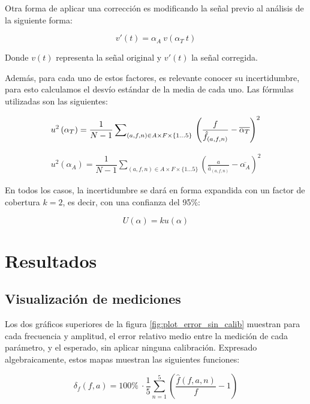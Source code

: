 \documentclass[conference]{IEEEtran}
\begin{document}
Otra forma de aplicar una corrección es modificando la señal previo al análisis
de la siguiente forma:

$$ v'(t) = \alpha_{A} ~ v(\alpha_T ~ t)$$

Donde $v(t)$ representa la señal original y $v'(t)$ la señal corregida.

Además, para cada uno de estos factores, es relevante conocer su incertidumbre,
para esto calculamos el desvío estándar de la media de cada uno. Las fórmulas
utilizadas son las siguientes:

\begin{equation}
u^2 \left( \alpha_{T} \right) = \dfrac{1}{N - 1} \sum_{(a,f,n) \in A \times F
\times \{1...5 \}}\nolimits \\\left( \frac{f}{\hat{f}_{(a,f,n)}} - 
\overline{\alpha_{T}} \right)^2
\label{eqn:alpha_f_u}
\end{equation}


\begin{equation}
\begin{split}
u^2 \left( \alpha_{A} \right) = \dfrac{1}{N - 1} \sum_{(a,f,n) \in A \times F
\times \{1...5 \}}\nolimits \left( \frac{a}{\hat{a}_{(a,f,n)}} -
\overline{\alpha_{A}} \right)^2 
\label{eqn:alpha_a_u}
\end{split}
\end{equation}

En todos los casos, la incertidumbre se dará en forma expandida con un factor de
cobertura $k = 2$, es decir, con una confianza del 95\%:

$$U(\alpha) = k u(\alpha)$$


\section{Resultados}


\subsection{Visualización de mediciones}


Los dos gráficos superiores de la figura \ref{fig:plot_error_sin_calib} muestran
para cada frecuencia y amplitud, el error relativo medio entre la medición de
cada parámetro, y el esperado, sin aplicar ninguna calibración.
Expresado algebraicamente, estos mapas muestran las siguientes funciones:

$$ \delta_{f} \left(f, a\right) = 100 \% ~ \cdot \dfrac{1}{5} \sum_{n=1}^{5}
\left( \dfrac{\hat{f}(f,a,n)}{f} - 1\right)$$
 
\end{document}
